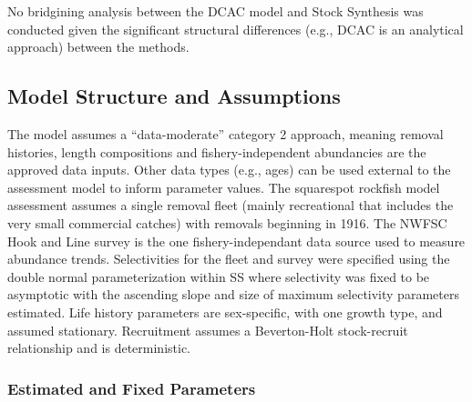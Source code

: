 \documentclass[11pt,
  english,
  a4paper,
]{article}
\begin{document}
\leavevmode\tagmcend\tagstructend


No bridgining analysis between the DCAC model and Stock Synthesis was conducted given the significant structural differences (e.g., DCAC is an analytical approach) between the methods.

\leavevmode\tagmcend\tagstructend\par


\hypertarget{model-structure-and-assumptions}{%
\subsection{Model Structure and Assumptions}\label{model-structure-and-assumptions}}

\leavevmode\tagmcend\tagstructend


The model assumes a ``data-moderate'' category 2 approach, meaning removal histories, length compositions and fishery-independent abundancies are the approved data inputs. Other data types (e.g., ages) can be used external to the assessment model to inform parameter values. The squarespot rockfish model assessment assumes a single removal fleet (mainly recreational that includes the very small commercial catches) with removals beginning in 1916. The NWFSC Hook and Line survey is the one fishery-independant data source used to measure abundance trends. Selectivities for the fleet and survey were specified using the double normal parameterization within SS where selectivity was fixed to be asymptotic with the ascending slope and size of maximum selectivity parameters estimated. Life history parameters are sex-specific, with one growth type, and assumed stationary. Recruitment assumes a Beverton-Holt stock-recruit relationship and is deterministic.

\leavevmode\tagmcend\tagstructend\par


\hypertarget{estimated-and-fixed-parameters}{%
\subsubsection{Estimated and Fixed Parameters}\label{estimated-and-fixed-parameters}}
\end{document}
